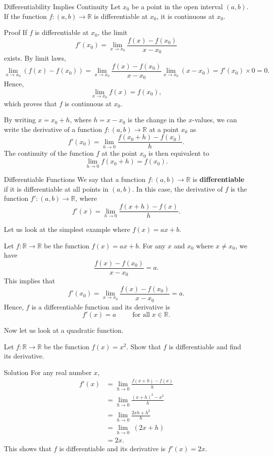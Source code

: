 \begin{theorem}[label=23021302]{Differentiability Implies Continuity}
Let $x_0$ be a point in the open interval $(a, b)$. If the function $f:(a,b)\to \mathbb{R}$ is differentiable at $x_0$, it is continuous  at $x_0$.
\end{theorem}
\begin{myproof}{Proof}
If $f$ is differentiable at $x_0$, the limit
\[f'(x_0)=\lim_{x\rightarrow x_0} \frac{f(x)-f(x_0)}{x-x_0}\] exists. By limit laws,
\[\lim_{x\to x_0}(f(x)-f(x_0))=\lim_{x\rightarrow x_0} \frac{f(x)-f(x_0)}{x-x_0}\lim_{x\to x_0}(x-x_0)=f'(x_0)\times 0=0.\]
Hence,
\[\lim_{x\to x_0}f(x)=f(x_0),\] which proves that $f$ is continuous at $x_0$.
\end{myproof}

\begin{highlight}{}
By writing $x=x_0+h$, where $h=x-x_0$ is the change in the $x$-values, we can write the derivative of a function $f:(a,b)\to\mathbb{R}$ at a point $x_0$ as
\[f'(x_0)=\lim_{h\to 0}\frac{f(x_0+h)-f(x_0)}{h}.\]
The continuity of the function $f$ at the point $x_0$ is then equivalent to
\[\lim_{h\to 0}f(x_0+h)=f(x_0).\]
\end{highlight}


\begin{definition}{Differentiable Functions}
We say that a function $f:(a,b)\to \mathbb{R}$ is {\bf differentiable} if it is differentiable at all points in $(a,b)$. In this case, the derivative of $f$ is the function $f':(a,b)\to\mathbb{R}$, where
\[f'(x)=\lim_{h\to 0}\frac{f(x+h)-f(x)}{h}.\]
\end{definition}
Let us look at the simplest example where $f(x)=ax+b$.
\begin{example}
{}
Let $f:\mathbb{R}\to\mathbb{R}$ be the function $f(x)=ax+b$. For any $x$ and $x_0$ where $x\neq x_0$, we have
\[\frac{f(x)-f(x_0)}{x-x_0}=a.\]
This implies that
\[f'(x_0)=\lim_{x\to x_0}\frac{f(x)-f(x_0)}{x-x_0}=a.\] Hence, $f$ is a differentiable function and its derivative is
\[f'(x)=a\hspace{1cm}\text{for all}\;x\in\mathbb{R}.\]
\end{example}

Now let us look at a quadratic function.
\begin{example}[label=23021301]{}
Let $f:\mathbb{R}\rightarrow \mathbb{R}$ be the function $f(x)=x^2$. Show that $f$ is differentiable and find its derivative.
\end{example}
\begin{solution}{Solution}
For any real number $x$,
\begin{align*}
f'(x)&=\lim_{h\to 0}\frac{f(x+h)-f(x)}{h}\\
&=\lim_{h\to 0}\frac{(x+h)^2-x^2}{h}\\
&=\lim_{h\to 0}\frac{2xh+h^2}{h}\\
&=\lim_{h\to 0}\;(2x+h)\\
&=2x.
\end{align*}This shows that $f$ is differentiable and its derivative is $f'(x)=2x$.
\end{solution}

